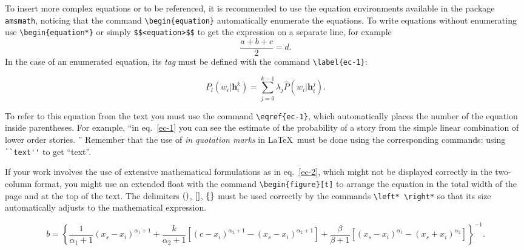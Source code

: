 \documentclass[eng]{ajceam-class}
\newcommand{\vect}[1]{\mathbf{#1}}  %
\begin{document}
To insert more complex equations or to be referenced, it is recommended to use the equation environments available in the package \verb!amsmath!, noticing that the command \verb!\begin{equation}! automatically enumerate the equations. To write equations without enumerating use \verb!\begin{equation*}! or simply \verb!$$<equation>$$! to get the expression on a separate line, for example $$ \frac{a + b + c}{2} = d. $$ In the case of an enumerated equation, its \emph{tag} must be defined with the command \verb!\label{ec-1}!:

\begin{equation} \label{ec-1}
 P_l(w_i|\vect{h}_i^{k}) = \sum_{j=0}^{k-1} \lambda_j \hat{P}(w_i|\vect{h}_i^{j}).
\end{equation}

To refer to this equation from the text you must use the command \verb!\eqref{ec-1}!, which automatically places the number of the equation inside parentheses. For example, ``in eq.~\eqref{ec-1} you can see the estimate of the probability of a story from the simple linear combination of lower order stories. '' Remember that the use of \emph{in quotation marks} in \LaTeX\ must be done using the corresponding commands: using \verb!``text''! to get ``text''.

If your work involves the use of extensive mathematical formulations as in eq.~\eqref{ec-2}, which might not be displayed correctly in the two-column format, you might use an extended float with the command \verb!\begin{figure}[t]! to arrange the equation in the total width of the page and at the top of the text. The delimiters  $(\mbox)$, $[\mbox]$, $\{\mbox\}$  must be used correctly by the commands \verb!\left* \right*! so that its size automatically adjusts to the mathematical expression. %

\begin{figure}[!t]
 \begin{equation}\label{ec-2}
   b = \left\{\frac{1}{\alpha_1 + 1}\left(x_s - x_i\right)^{\alpha_1+1} + \frac{k}{\alpha_2 + 1}
   \left[\left(c - x_i\right)^{\alpha_2+1} - \left(x_s - x_i\right)^{\alpha_2+1}\right]
   + \frac{\beta}{\beta + 1}\left[\left(x_s - x_i\right)^{\alpha_1} - 
   \left(x_s + x_i\right)^{\alpha_2}\right]\right\}^{-1}.
 \end{equation}
\end{figure}
\end{document}
